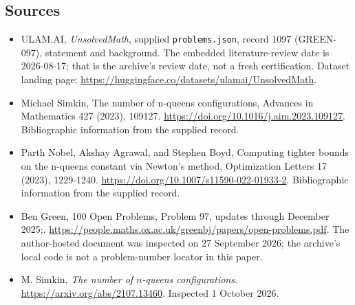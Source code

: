 \documentclass[11pt,a4paper]{article}
\begin{document}
\subsection{Sources}

{\small

\begin{itemize}

\item[\hypertarget{source:1097:1}{S1}] ULAM.AI, \emph{UnsolvedMath}, supplied \texttt{problems.json}, record 1097 (GREEN-097), statement and background. The embedded literature-review date is 2026-08-17; that is the archive’s review date, not a fresh certification. Dataset landing page: \url{https://huggingface.co/datasets/ulamai/UnsolvedMath}.

\item[\hypertarget{source:1097:2}{S2}] Michael Simkin, The number of n-queens configurations, Advances in Mathematics 427 (2023), 109127. \url{https://doi.org/10.1016/j.aim.2023.109127}. Bibliographic information from the supplied record.

\item[\hypertarget{source:1097:3}{S3}] Parth Nobel, Akshay Agrawal, and Stephen Boyd, Computing tighter bounds on the n-queens constant via Newton's method, Optimization Letters 17 (2023), 1229-1240. \url{https://doi.org/10.1007/s11590-022-01933-2}. Bibliographic information from the supplied record.

\item[\hypertarget{source:1097:4}{S4}] Ben Green, 100 Open Problems, Problem 97, updates through December 2025;. \url{https://people.maths.ox.ac.uk/greenbj/papers/open-problems.pdf}. The author-hosted document was inspected on 27 September 2026; the archive’s local code is not a problem-number locator in this paper.

\item[E1] M. Simkin, \emph{The number of $n$-queens configurations}. \url{https://arxiv.org/abs/2107.13460}. Inspected 1 October 2026.

\end{itemize}

}

\label{end:1097}
\end{document}
